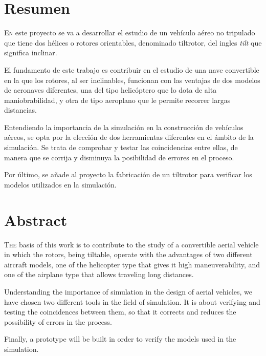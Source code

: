 \chapter*{Resumen}
\pagestyle{especial}
{}

\lettrine[lraise=-0.1, lines=2, loversize=0.2]{E}{n} este proyecto  se va a desarrollar el  estudio de  un vehículo aéreo no tripulado que tiene dos hélices o rotores orientables, denominado tiltrotor, del ingles \textit{tilt} que significa inclinar.

El fundamento de este trabajo es contribuir  en el estudio de una nave convertible en la  que los rotores, al ser  inclinables, funcionan con las ventajas de   dos modelos de aeronaves diferentes, una del tipo helicóptero que lo dota de alta maniobrabilidad,  y otra de tipo aeroplano que le permite recorrer largas distancias.

Entendiendo la importancia de la simulación en la construcción de vehículos aéreos, se  opta por la elección de dos herramientas diferentes en el ámbito de la simulación. Se trata de comprobar y testar las coincidencias entre ellas, de manera que se corrija y  disminuya la posibilidad de errores  en el proceso.

Por último, se  añade al proyecto la fabricación de un tiltrotor para verificar los modelos utilizados en la simulación. 



\chapter*{Abstract}
\pagestyle{especial}
{}

\lettrine[lraise=-0.1, lines=2, loversize=0.2]{T}{he} basis of this work is to contribute to the study of a convertible aerial vehicle in which the rotors, being tiltable, operate with the advantages of two different aircraft models, one of the helicopter type that gives it high maneuverability, and one of the airplane type that allows traveling long distances.

Understanding the importance of simulation in the design of aerial vehicles, we have chosen two different tools in the field of simulation. It is about verifying and testing the coincidences between them, so that it corrects and reduces the possibility of errors in the process.

Finally, a prototype will be built in order to verify the models used in the simulation.
